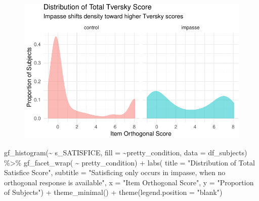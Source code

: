 \documentclass[
  letterpaper,
  DIV=11,
  numbers=noendperiod]{scrreprt}
\newenvironment{Shaded}{\begin{snugshade}}{\end{snugshade}}
\newcommand{\AttributeTok}[1]{\textcolor[rgb]{0.40,0.45,0.13}{#1}}
\newcommand{\FunctionTok}[1]{\textcolor[rgb]{0.28,0.35,0.67}{#1}}
\newcommand{\NormalTok}[1]{\textcolor[rgb]{0.00,0.23,0.31}{#1}}
\newcommand{\SpecialCharTok}[1]{\textcolor[rgb]{0.37,0.37,0.37}{#1}}
\newcommand{\StringTok}[1]{\textcolor[rgb]{0.13,0.47,0.30}{#1}}
\begin{document}
\begin{figure}[H]

{\centering \includegraphics{analysis/SGC3A/2_sgc3A_scoring_files/figure-pdf/DIST-SUBSCORES-3.pdf}

}

\end{figure}

\begin{Shaded}
\begin{Highlighting}[]
\FunctionTok{gf\_histogram}\NormalTok{(}\SpecialCharTok{\textasciitilde{}}\NormalTok{ s\_SATISFICE, }\AttributeTok{fill =} \SpecialCharTok{\textasciitilde{}}\NormalTok{pretty\_condition, }\AttributeTok{data =}\NormalTok{ df\_subjects) }\SpecialCharTok{\%\textgreater{}\%} 
  \FunctionTok{gf\_facet\_wrap}\NormalTok{( }\SpecialCharTok{\textasciitilde{}}\NormalTok{ pretty\_condition) }\SpecialCharTok{+} 
  \FunctionTok{labs}\NormalTok{( }\AttributeTok{title =} \StringTok{"Distribution of Total Satisfice Score"}\NormalTok{,}
        \AttributeTok{subtitle =} \StringTok{"Satisficing only occurs in impasse, when no orthogonal response is available"}\NormalTok{,}
        \AttributeTok{x =} \StringTok{"Item Orthogonal Score"}\NormalTok{, }\AttributeTok{y =} \StringTok{"Proportion of Subjects"}\NormalTok{) }\SpecialCharTok{+} 
        \FunctionTok{theme\_minimal}\NormalTok{() }\SpecialCharTok{+} \FunctionTok{theme}\NormalTok{(}\AttributeTok{legend.position =} \StringTok{"blank"}\NormalTok{)}
\end{Highlighting}
\end{Shaded}
\end{document}
